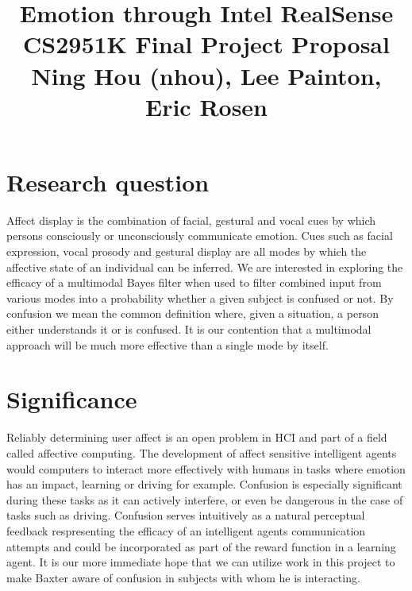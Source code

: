 \documentclass[12pt,letterpaper]{article}
\begin{document}
\title{Emotion through Intel RealSense\\ \vspace{2 mm} {\large CS2951K Final Project Proposal}\\ {\large Ning Hou (nhou), Lee Painton, Eric Rosen}}

\maketitle

\section{Research question}
Affect display is the combination of facial, gestural and vocal cues by which persons consciously or unconsciously communicate emotion.  Cues such as facial expression, vocal prosody and gestural display are all modes by which the affective state of an individual can be inferred.  We are interested in exploring the efficacy of a multimodal Bayes filter when used to filter combined input from various modes into a probability whether a given subject is confused or not.  By confusion we mean the common definition where, given a situation, a person either understands it or is confused.  It is our contention that a multimodal approach will be much more effective than a single mode by itself.

\section{Significance}
Reliably determining user affect is an open problem in HCI and part of a field called affective computing.  The development of affect sensitive intelligent agents would computers to interact more effectively with humans in tasks where emotion has an impact, learning or driving for example.  Confusion is especially significant during these tasks as it can actively interfere, or even be dangerous in the case of tasks such as driving.  Confusion serves intuitively as a natural perceptual feedback respresenting the efficacy of an intelligent agents communication attempts and could be incorporated as part of the reward function in a learning agent.  It is our more immediate hope that we can utilize work in this project to make Baxter aware of confusion in subjects with whom he is interacting.
\end{document}
